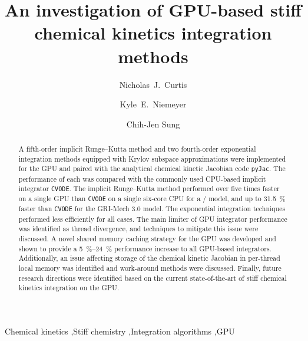\documentclass[preprint]{elsarticle}
\begin{document}
\begin{frontmatter}

\title{An investigation of GPU-based stiff chemical kinetics integration methods}

\author[uconn]{Nicholas~J.\ Curtis}
\author[osu]{Kyle~E.\ Niemeyer}
\author[uconn]{Chih-Jen Sung}

\address[uconn]{Department of Mechanical Engineering\\
  University of Connecticut, Storrs, CT, 06269, USA}
\address[osu]{School of Mechanical, Industrial, and Manufacturing Engineering\\
  Oregon State University, Corvallis, OR 97331, USA}
  

\begin{abstract}
A fifth-order implicit Runge--Kutta method and two fourth-order exponential integration methods equipped with Krylov subspace approximations were implemented for the GPU and paired with the analytical chemical kinetic Jacobian code \texttt{pyJac}.
The performance of each was compared with the commonly used CPU-based implicit integrator \texttt{CVODE}.
The implicit Runge--Kutta method performed over five times faster on a single GPU than \texttt{CVODE} on a single six-core CPU for a \slash{} model, and up to \SI{31.5}{\percent} faster than \texttt{CVODE} for the GRI-Mech 3.0 model.
The exponential integration techniques performed less efficiently for all cases.
The main limiter of GPU integrator performance was identified as thread divergence, and techniques to mitigate this issue were discussed.
A novel shared memory caching strategy for the GPU was developed and shown to provide a \SIrange{5}{24}{\percent} performance increase to all GPU-based integrators.
Additionally, an issue affecting storage of the chemical kinetic Jacobian in per-thread local memory was identified and work-around methods were discussed.
Finally, future research directions were identified based on the current state-of-the-art of stiff chemical kinetics integration on the GPU.
\end{abstract}

\begin{keyword}
 Chemical kinetics \sep Stiff chemistry \sep Integration algorithms \sep GPU
\end{keyword}

\end{frontmatter}
\end{document}
